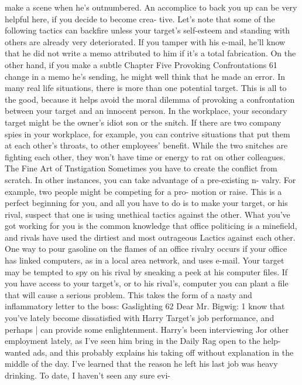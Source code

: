 \documentclass{book}
\begin{document}
make a scene when he's outnumbered. An accomplice to back 
you up can be very helpful here, if you decide to become crea- 
tive. 
Let's note that some of the following tactics can backfire 
unless your target's self-esteem and standing with others are 
already very deteriorated. If you tamper with his e-mail, he'll 
know that he did not write a memo attributed to him if it's a 
total fabrication. On the other hand, if you make a subtle 
Chapter Five 
Provoking Confrontations 
61 
change in a memo he's sending, he might well think that he 
made an error. 
In many real life situations, there is more than one potential 
target. This is all to the good, because it helps avoid the moral 
dilemma of provoking a confrontation between your target and 
an innocent person. In the workplace, your secondary target 
might be the owner's idiot son or the snitch. If there are two 
company spies in your workplace, for example, you can 
contrive situations that put them at each other's throats, to other 
employees’ benefit. While the two snitches are fighting each 
other, they won't have time or energy to rat on other colleagues. 
The Fine Art of Tnstigation 
Sometimes you have to create the conflict from scratch. In 
other instances, you can take advantage of a pre-existing n- 
valry. For example, two people might be competing for a pro- 
motion or raise. This is a perfect beginning for you, and all you 
have to do is to make your target, or his rival, suspect that one 
is using unethical tactics against the other. What you've got 
working for you is the common knowledge that office politicing 
is a minefield, and rivals have used the dirtiest and most 
outrageous Lactics against each other. 
One way to pour gasoline on the flames of an office rivalry 
occurs if your office has linked computers, as in a local area 
network, and uses e-mail. Your target may be tempted to spy on 
his rival by sneaking a peek at his computer files. If you have 
access to your target's, or to his rival's, computer you can plant 
a file that will cause a serious problem. This takes the form of a 
nasty and inflammatory letter to the boss:  
Gaslighting 
62 
Dear Mr. Bigwig: 
1 know that you've lately become dissatisfied with 
Harry Target's job performance, and perhaps | can 
provide some enlightenment. Harry's been interviewing 
Jor other employment lately, as I've seen him bring in 
the Daily Rag open to the help-wanted ads, and this 
probably explains his taking off without explanation in 
the middle of the day. 
I've learned that the reason he left his last job was 
heavy drinking. To date, I haven't seen any sure evi- 
\end{document}
